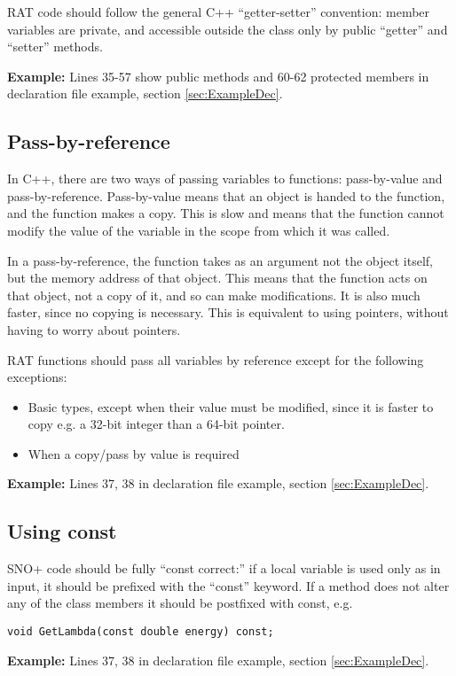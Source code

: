 \documentclass[11pt]{article}
\begin{document}
RAT code should follow the general C++ ``getter-setter'' convention: member variables are private, and accessible outside the class only by public ``getter'' and ``setter'' methods.

{\bf Example:} Lines 35-57 show public methods and 60-62 protected members in declaration file example, section \ref{sec:ExampleDec}.

\subsection{Pass-by-reference}
In C++, there are two ways of passing variables to functions: pass-by-value and pass-by-reference. Pass-by-value means that an object is handed to the function, and the function makes a copy. This is slow and means that the function cannot modify the value of the variable in the scope from which it was called.

In a pass-by-reference, the function takes as an argument not the object itself, but the memory address of that object. This means that the function acts on that object, not a copy of it, and so can make modifications. It is also much faster, since no copying is necessary. This is equivalent to using pointers, without having to worry about pointers.

RAT functions should pass all variables by reference except for the following exceptions:
\begin{itemize}
\item Basic types, except when their value must be modified, since it is faster to copy e.g. a 32-bit integer than a 64-bit pointer.
\item When a copy/pass by value is required
\end{itemize}

{\bf Example:} Lines 37, 38 in declaration file example, section \ref{sec:ExampleDec}.

\subsection{Using const}
SNO+ code should be fully ``const correct:'' if a local variable is used only as in input, it should be prefixed with the ``const'' keyword. If a method does not alter any of the class members it should be postfixed with const, e.g.
\begin{verbatim}
void GetLambda(const double energy) const;
\end{verbatim}
{\bf Example:} Lines 37, 38 in declaration file example, section \ref{sec:ExampleDec}.
\end{document}
